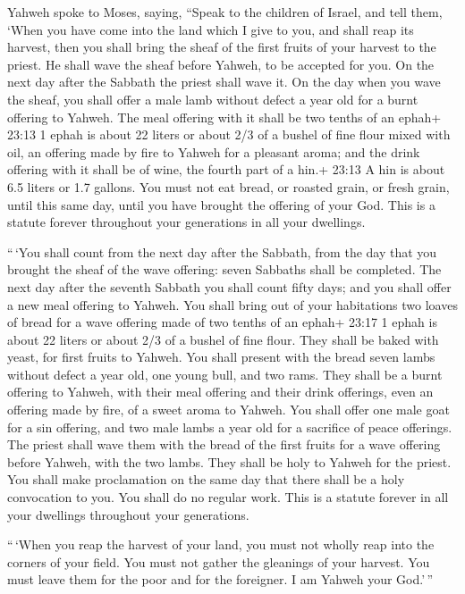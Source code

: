  Yahweh spoke to Moses, saying,  ``Speak to the
children of Israel, and tell them, `When you have come into the land
which I give to you, and shall reap its harvest, then you shall bring
the sheaf of the first fruits of your harvest to the priest.
 He shall wave the sheaf before Yahweh, to be accepted for
you. On the next day after the Sabbath the priest shall wave it.
 On the day when you wave the sheaf, you shall offer a male
lamb without defect a year old for a burnt offering to Yahweh.
 The meal offering with it shall be two tenths of an ephah+
23:13 1 ephah is about 22 liters or about 2/3 of a bushel of fine flour
mixed with oil, an offering made by fire to Yahweh for a pleasant aroma;
and the drink offering with it shall be of wine, the fourth part of a
hin.+ 23:13 A hin is about 6.5 liters or 1.7 gallons.  You
must not eat bread, or roasted grain, or fresh grain, until this same
day, until you have brought the offering of your God. This is a statute
forever throughout your generations in all your dwellings.

 ``\,`You shall count from the next day after the Sabbath,
from the day that you brought the sheaf of the wave offering: seven
Sabbaths shall be completed.  The next day after the
seventh Sabbath you shall count fifty days; and you shall offer a new
meal offering to Yahweh.  You shall bring out of your
habitations two loaves of bread for a wave offering made of two tenths
of an ephah+ 23:17 1 ephah is about 22 liters or about 2/3 of a bushel
of fine flour. They shall be baked with yeast, for first fruits to
Yahweh.  You shall present with the bread seven lambs
without defect a year old, one young bull, and two rams. They shall be a
burnt offering to Yahweh, with their meal offering and their drink
offerings, even an offering made by fire, of a sweet aroma to Yahweh.
 You shall offer one male goat for a sin offering, and two
male lambs a year old for a sacrifice of peace offerings. 
The priest shall wave them with the bread of the first fruits for a wave
offering before Yahweh, with the two lambs. They shall be holy to Yahweh
for the priest.  You shall make proclamation on the same
day that there shall be a holy convocation to you. You shall do no
regular work. This is a statute forever in all your dwellings throughout
your generations.

 ``\,`When you reap the harvest of your land, you must not
wholly reap into the corners of your field. You must not gather the
gleanings of your harvest. You must leave them for the poor and for the
foreigner. I am Yahweh your God.'\,''

